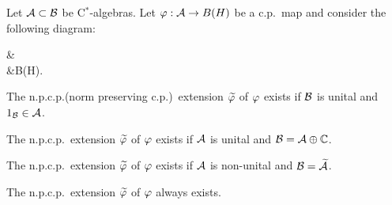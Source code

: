 \documentclass{../../small}
\begin{document}
\begin{thm}
Let $\mathcal{A}\subset\mathcal{B}$ be C$^*$-algebras.
Let $\varphi:\mathcal{A}\to B(H)$ be a c.p.~map and consider the following diagram:
\begin{cd}
\cB{}&\\
\cA{}&B(H).
\end{cd}
\begin{parts}
\item The n.p.c.p.(norm preserving c.p.)~extension $\widetilde{\varphi}$ of $\varphi$ exists if $\mathcal{B}$ is unital and $1_{\mathcal{B}}\in\mathcal{A}$.
\item The n.p.c.p.~extension $\widetilde{\varphi}$ of $\varphi$ exists if $\mathcal{A}$ is unital and $\mathcal{B}=\mathcal{A}\oplus\mathbb{C}$.
\item The n.p.c.p.~extension $\widetilde{\varphi}$ of $\varphi$ exists if $\mathcal{A}$ is non-unital and $\mathcal{B}=\widetilde{\mathcal{A}}$.
\item The n.p.c.p.~extension $\widetilde{\varphi}$ of $\varphi$ always exists.
\end{parts}
\end{thm}
\end{document}
